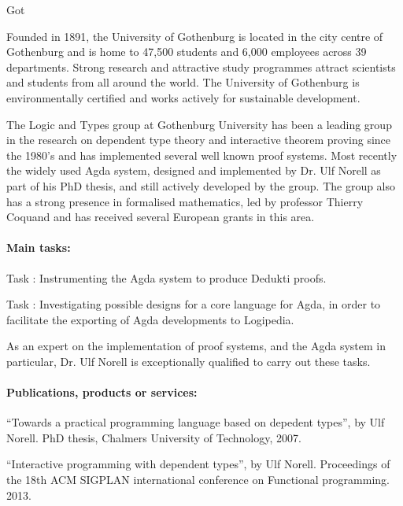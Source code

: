 \begin{sitedescription}{Got}


Founded in 1891, the University of Gothenburg is located in the city centre
of Gothenburg and is home to 47,500 students and 6,000 employees across 39
departments. Strong research and attractive study programmes attract
scientists and students from all around the world. The University of
Gothenburg is environmentally certified and works actively for sustainable
development.

The Logic and Types group at Gothenburg University has been a leading group
in the research on dependent type theory and interactive theorem proving
since the 1980's and has implemented several well known proof systems. Most
recently the widely used Agda system, designed and implemented by Dr. Ulf
Norell as part of his PhD thesis, and still actively developed by the
group. The group also has a strong presence in formalised mathematics, led
by professor Thierry Coquand and has received several European grants in
this area.

\paragraph*{Main tasks:}

\begin{compactitem}
\item Task :
  Instrumenting the Agda system to produce Dedukti proofs.
\item Task :
  Investigating possible designs for a core language for Agda, in
  order to facilitate the exporting of Agda developments to Logipedia.
\end{compactitem}
As an expert on the implementation of proof systems, and the Agda system in
particular, Dr. Ulf Norell is exceptionally qualified to carry out these
tasks.

\paragraph*{Publications, products or services:}
\begin{compactitem}
  \item ``Towards a practical programming language based on
  depedent types'', by Ulf Norell. PhD thesis, Chalmers University of Technology, 2007.
  \item ``Interactive programming with dependent types'', by Ulf Norell.
  Proceedings of the 18th ACM SIGPLAN international conference on
  Functional programming. 2013.
\end{compactitem}


\end{sitedescription}
